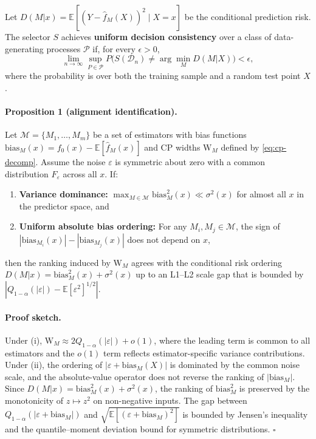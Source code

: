 \documentclass[pdflatex,sn-mathphys-ay]{sn-jnl}%
\theoremstyle{thmstyleone}%
\theoremstyle{thmstyletwo}%
\theoremstyle{thmstylethree}%
\begin{document}
Let $D(M|x) = \mathbb{E}[(Y - \hat{f}_M(X))^2 \mid X = x]$ be the conditional prediction risk. The selector $S$ achieves \textbf{uniform decision consistency} over a class of data-generating processes $\mathcal{P}$ if, for every $\epsilon > 0$,
\[
\lim_{n \to \infty} \sup_{P \in \mathcal{P}} P\bigl(S(\mathcal{D}_n) \neq \arg\min_M D(M|X)\bigr) < \epsilon,
\]
where the probability is over both the training sample and a random test point $X$.

\paragraph{Proposition 1 (alignment identification).}
Let $\mathcal{M} = \{M_1, \ldots, M_m\}$ be a set of estimators with bias functions $\text{bias}_M(x) = f_0(x) - \mathbb{E}[\hat{f}_M(x)]$ and CP widths $\text{W}_M$ defined by \eqref{eq:cp-decomp}. Assume the noise $\varepsilon$ is symmetric about zero with a common distribution $F_\varepsilon$ across all $x$. If:
\begin{enumerate}
    \item[(i)] \textbf{Variance dominance:} $\max_{M \in \mathcal{M}} \text{bias}_M^2(x) \ll \sigma^2(x)$ for almost all $x$ in the predictor space, and
    \item[(ii)] \textbf{Uniform absolute bias ordering:} For any $M_i, M_j \in \mathcal{M}$, the sign of $|\text{bias}_{M_i}(x)| - |\text{bias}_{M_j}(x)|$ does not depend on $x$,
\end{enumerate}
then the ranking induced by $\text{W}_M$ agrees with the conditional risk ordering $D(M|x) = \text{bias}_M^2(x) + \sigma^2(x)$ up to an L1--L2 scale gap that is bounded by $|Q_{1-\alpha}(|\varepsilon|) - \mathbb{E}[\varepsilon^2]^{1/2}|$.

\paragraph{Proof sketch.}
Under (i), $\text{W}_M \approx 2Q_{1-\alpha}(|\varepsilon|) + o(1)$, where the leading term is common to all estimators and the $o(1)$ term reflects estimator-specific variance contributions. Under (ii), the ordering of $|\varepsilon + \text{bias}_M(X)|$ is dominated by the common noise scale, and the absolute-value operator does not reverse the ranking of $|\text{bias}_M|$. Since $D(M|x) = \text{bias}_M^2(x) + \sigma^2(x)$, the ranking of $\text{bias}_M^2$ is preserved by the monotonicity of $z \mapsto z^2$ on non-negative inputs. The gap between $Q_{1-\alpha}(|\varepsilon + \text{bias}_M|)$ and $\sqrt{\mathbb{E}[(\varepsilon + \text{bias}_M)^2]}$ is bounded by Jensen's inequality and the quantile--moment deviation bound for symmetric distributions. $\square$
\end{document}
